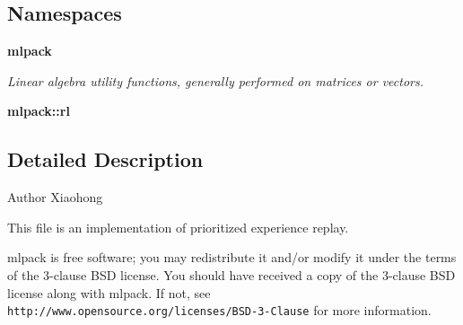 \subsection*{Namespaces}
\begin{DoxyCompactItemize}
\item 
 \textbf{ mlpack}
\begin{DoxyCompactList}\small\item\em Linear algebra utility functions, generally performed on matrices or vectors. \end{DoxyCompactList}\item 
 \textbf{ mlpack\+::rl}
\end{DoxyCompactItemize}


\subsection{Detailed Description}
\begin{DoxyAuthor}{Author}
Xiaohong
\end{DoxyAuthor}
This file is an implementation of prioritized experience replay.

mlpack is free software; you may redistribute it and/or modify it under the terms of the 3-\/clause B\+SD license. You should have received a copy of the 3-\/clause B\+SD license along with mlpack. If not, see {\tt http\+://www.\+opensource.\+org/licenses/\+B\+S\+D-\/3-\/\+Clause} for more information. 